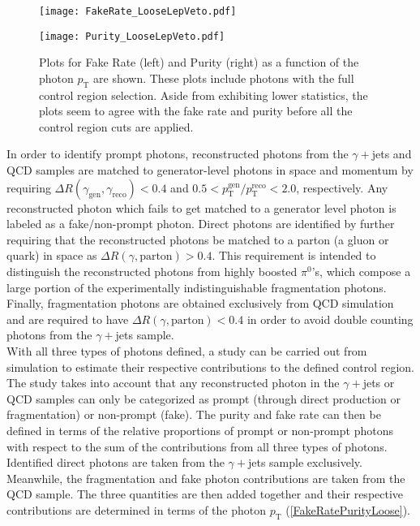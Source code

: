 \begin{figure}[H]
\begin{center}
\begin{minipage}[b]{0.49\textwidth}
\texttt{[image: FakeRate\_LooseLepVeto.pdf]}
\end{minipage}
\begin{minipage}[b]{0.49\textwidth}
    \texttt{[image: Purity\_LooseLepVeto.pdf]}
\end{minipage}
\end{center}
\vspace{-1em}
\caption{Plots for Fake Rate (left) and Purity (right) as a function of the photon $p_\text{T}$ are shown. These plots include photons with the full control region selection. Aside from exhibiting lower statistics, the plots seem to agree with the fake rate and purity before all the control region cuts are applied.}
\label{FakeRatePurityCR}
\end{figure}

\vspace{1em}

In order to identify prompt photons, reconstructed photons from the $\gamma+$jets and QCD samples are matched to generator-level photons in space and momentum by requiring $\Delta R(\gamma_\text{gen},\gamma_\text{reco}) < 0.4$ and $0.5 < p_\text{T}^\text{gen}/p_\text{T}^\text{reco} < 2.0$, respectively. Any reconstructed photon which fails to get matched to a generator level photon is labeled as a fake/non-prompt photon. Direct photons are identified by further requiring that the reconstructed photons be matched to a parton (a gluon or quark) in space as $\Delta R(\gamma,\text{parton}) > 0.4$. This requirement is intended to distinguish the reconstructed photons from highly boosted $\pi^0$'s, which compose a large portion of the experimentally indistinguishable fragmentation photons. Finally, fragmentation photons are obtained exclusively from QCD simulation and are required to have $\Delta R(\gamma,\text{parton}) < 0.4$ in order to avoid double counting photons from the $\gamma+$jets sample.\\

With all three types of photons defined, a study can be carried out from simulation to estimate their respective contributions to the defined control region. The study takes into account that any reconstructed photon in the $\gamma+$jets or QCD samples can only be categorized as prompt (through direct production or fragmentation) or non-prompt (fake). The purity and fake rate can then be defined in terms of the relative proportions of prompt or non-prompt photons with respect to the sum of the contributions from all three types of photons. Identified direct photons are taken from the $\gamma+$jets sample exclusively. Meanwhile, the fragmentation and fake photon contributions are taken from the QCD sample. The three quantities are then added together and their respective contributions are determined in terms of the photon $p_\text{T}$ (\autoref{FakeRatePurityLoose}).\\

